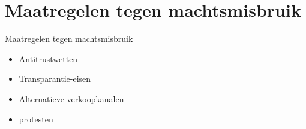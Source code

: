 \documentclass{beamer}
\begin{document}
    
\section[Maatregelen]{Maatregelen tegen machtsmisbruik}
\begin{frame}{Maatregelen tegen machtsmisbruik}
    \begin{itemize}
        \item Antitrustwetten
        \item Transparantie-eisen
        \item Alternatieve verkoopkanalen
        \item protesten
    \end{itemize}
\end{frame}

\end{document}
